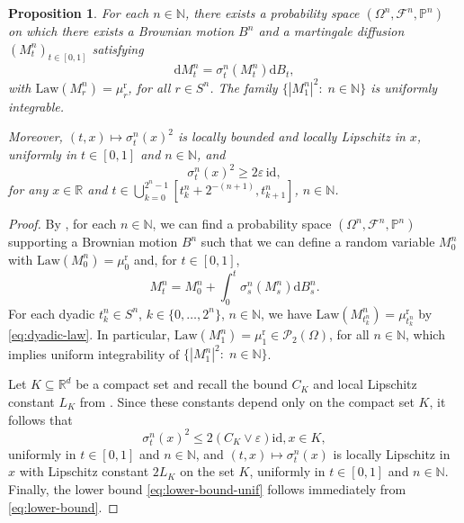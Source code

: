 \documentclass[12pt,oneside]{amsart}
\newtheorem{proposition}[theorem]{Proposition}
\theoremstyle{definition}
\newcommand{\F}{\mathcal F}
\newcommand{\Law}{\mathrm{Law}}
\newcommand{\id}{\mathrm{id}}
\newcommand{\D}{\mathrm{d}}
\newcommand{\N}{\mathbb N}
\newcommand{\R}{\mathbb R}
\newcommand{\Pc}{\mathcal P}
\newcommand{\reg}{\mathrm{r}}
\def\P{{\mathbb P}}
\def\R{{\mathbb R}}
\numberwithin{equation}{section}
\begin{document}
\begin{proposition}\label{prop:pasting-intervals}
	For each $n \in \N$, there exists a probability space $(\Omega^n, \F^n, \P^n)$ on which there exists a Brownian motion $B^n$ and a martingale diffusion $(M^{n}_t)_{t \in [0, 1]}$ satisfying
	\begin{equation}
		\D M^{n}_t = \sigma^{n}_t(M^{n}_t) \D B_t,
	\end{equation}
	with $\Law(M^{n}_r) = \mu^\reg_r$, for all $r \in S^n$. The family $\{|M^n_1|^2 \colon \; n \in \N\}$ is uniformly integrable.
	
	Moreover, $(t, x) \mapsto \sigma^n_t(x)^2$ is locally bounded and locally Lipschitz in $x$, uniformly in $t \in [0, 1]$ and $n \in \N$, and
	\begin{equation}\label{eq:lower-bound-unif}
		\sigma^{n}_t(x)^2 \geq 2 \varepsilon \, \id,
	\end{equation}
	for any $x \in \R$ and $t \in \bigcup_{k = 0}^{2^n - 1}[t^n_k + 2^{-(n + 1)}, t^n_{k + 1}]$, $n \in \N$.
\end{proposition}

\begin{proof}
	By , for each $n \in \N$, we can find a probability space $(\Omega^n, \F^n, \P^n)$ supporting a Brownian motion $B^n$ such that we can define a random variable $M^n_0$ with $\Law(M^n_0) = \mu^\reg_0$ and, for $t \in [0, 1]$,
	\begin{equation}
		M^n_t = M^n_0 + \int_0^t \sigma^n_s(M^n_s) \D B^n_s.
	\end{equation}
	For each dyadic $t^n_k \in S^n$, $k \in \{0, \dotsc, 2^n\}$, $n \in \N$, we have $\Law(M^{n}_{t^n_k}) = \mu^\reg_{t^n_k}$ by \eqref{eq:dyadic-law}. In particular, $\Law(M^n_1) = \mu^\reg_1 \in \Pc_2(\Omega)$, for all $n \in \N$, which implies uniform integrability of $\{|M^n_1|^2 \colon \; n \in \N\}$.
	
	Let $K \subseteq \R^d$ be a compact set and recall the bound $C_K$ and local Lipschitz constant $L_K$ from . Since these constants depend only on the compact set $K$, it follows that
	\begin{equation}
		\sigma^n_t(x)^2 \leq 2 (C_K \vee \varepsilon) \id, x \in K,
	\end{equation}
	uniformly in $t \in [0, 1]$ and $n \in \N$, and $(t, x) \mapsto \sigma^n_t(x)$ is locally Lipschitz in $x$ with Lipschitz constant $2 L_K$ on the set $K$, uniformly in $t \in [0, 1]$ and $n \in \N$. Finally, the lower bound \eqref{eq:lower-bound-unif} follows immediately from \eqref{eq:lower-bound}.
	\end{proof}
\end{document}
